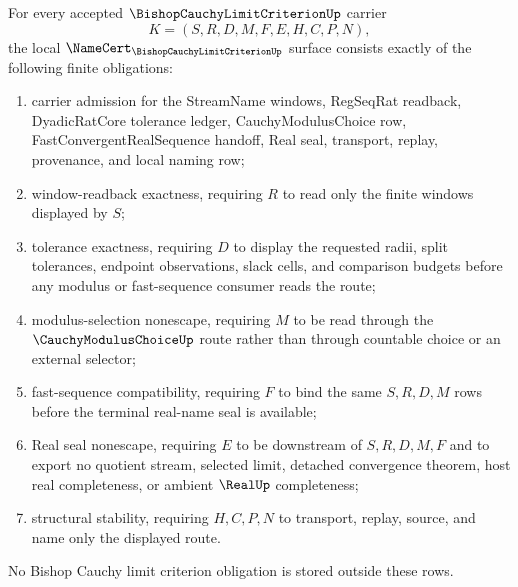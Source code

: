 \begin{theorem}
\label{thm:bishop-cauchy-limit-criterion-namecert-obligations}
For every accepted $\BishopCauchyLimitCriterionUp$ carrier
$$
K=(S,R,D,M,F,E,H,C,P,N),
$$
the local $\NameCert_{\BishopCauchyLimitCriterionUp}$ surface consists exactly of the following finite obligations:
\begin{enumerate}
\item carrier admission for the StreamName windows, RegSeqRat readback, DyadicRatCore tolerance ledger, CauchyModulusChoice row, FastConvergentRealSequence handoff, Real seal, transport, replay, provenance, and local naming row;
\item window-readback exactness, requiring $R$ to read only the finite windows displayed by $S$;
\item tolerance exactness, requiring $D$ to display the requested radii, split tolerances, endpoint observations, slack cells, and comparison budgets before any modulus or fast-sequence consumer reads the route;
\item modulus-selection nonescape, requiring $M$ to be read through the $\CauchyModulusChoiceUp$ route rather than through countable choice or an external selector;
\item fast-sequence compatibility, requiring $F$ to bind the same $S,R,D,M$ rows before the terminal real-name seal is available;
\item Real seal nonescape, requiring $E$ to be downstream of $S,R,D,M,F$ and to export no quotient stream, selected limit, detached convergence theorem, host real completeness, or ambient $\RealUp$ completeness;
\item structural stability, requiring $H,C,P,N$ to transport, replay, source, and name only the displayed route.
\end{enumerate}
No Bishop Cauchy limit criterion obligation is stored outside these rows.
\end{theorem}

